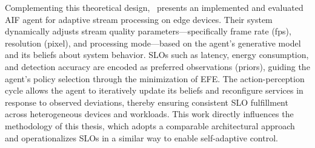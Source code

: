 Complementing this theoretical design,~\cite{sedlak_adaptive_2024} presents an implemented and evaluated AIF agent for adaptive stream processing on edge devices. Their system dynamically adjusts stream quality parameters---specifically frame rate (fps), resolution (pixel), and processing mode—based on the agent’s generative model and its beliefs about system behavior. SLOs such as latency, energy consumption, and detection accuracy are encoded as preferred observations (priors), guiding the agent’s policy selection through the minimization of EFE. The action-perception cycle allows the agent to iteratively update its beliefs and reconfigure services in response to observed deviations, thereby ensuring consistent SLO fulfillment across heterogeneous devices and workloads. This work directly influences the methodology of this thesis, which adopts a comparable architectural approach and operationalizes SLOs in a similar way to enable self-adaptive control.


